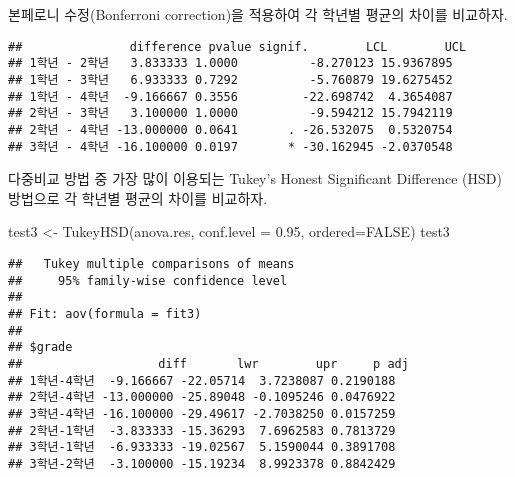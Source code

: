 \documentclass[
]{book}
\newenvironment{Shaded}{\begin{snugshade}}{\end{snugshade}}
\newcommand{\AttributeTok}[1]{\textcolor[rgb]{0.77,0.63,0.00}{#1}}
\newcommand{\ConstantTok}[1]{\textcolor[rgb]{0.00,0.00,0.00}{#1}}
\newcommand{\FloatTok}[1]{\textcolor[rgb]{0.00,0.00,0.81}{#1}}
\newcommand{\FunctionTok}[1]{\textcolor[rgb]{0.00,0.00,0.00}{#1}}
\newcommand{\NormalTok}[1]{#1}
\newcommand{\OtherTok}[1]{\textcolor[rgb]{0.56,0.35,0.01}{#1}}
\newcommand{\SpecialCharTok}[1]{\textcolor[rgb]{0.00,0.00,0.00}{#1}}
\newcommand{\StringTok}[1]{\textcolor[rgb]{0.31,0.60,0.02}{#1}}
\begin{document}
본페로니 수정(Bonferroni correction)을 적용하여 각 학년별 평균의 차이를 비교하자.

\begin{Shaded}
\end{Shaded}

\begin{verbatim}
##               difference pvalue signif.        LCL        UCL
## 1학년 - 2학년   3.833333 1.0000          -8.270123 15.9367895
## 1학년 - 3학년   6.933333 0.7292          -5.760879 19.6275452
## 1학년 - 4학년  -9.166667 0.3556         -22.698742  4.3654087
## 2학년 - 3학년   3.100000 1.0000          -9.594212 15.7942119
## 2학년 - 4학년 -13.000000 0.0641       . -26.532075  0.5320754
## 3학년 - 4학년 -16.100000 0.0197       * -30.162945 -2.0370548
\end{verbatim}

다중비교 방법 중 가장 많이 이용되는 Tukey's Honest Significant Difference (HSD) 방법으로
각 학년별 평균의 차이를 비교하자.

\begin{Shaded}
\begin{Highlighting}[]
\NormalTok{test3 }\OtherTok{\textless{}{-}} \FunctionTok{TukeyHSD}\NormalTok{(anova.res, }\AttributeTok{conf.level =} \FloatTok{0.95}\NormalTok{, }\AttributeTok{ordered=}\ConstantTok{FALSE}\NormalTok{)}
\NormalTok{test3}
\end{Highlighting}
\end{Shaded}

\begin{verbatim}
##   Tukey multiple comparisons of means
##     95% family-wise confidence level
## 
## Fit: aov(formula = fit3)
## 
## $grade
##                   diff       lwr        upr     p adj
## 1학년-4학년  -9.166667 -22.05714  3.7238087 0.2190188
## 2학년-4학년 -13.000000 -25.89048 -0.1095246 0.0476922
## 3학년-4학년 -16.100000 -29.49617 -2.7038250 0.0157259
## 2학년-1학년  -3.833333 -15.36293  7.6962583 0.7813729
## 3학년-1학년  -6.933333 -19.02567  5.1590044 0.3891708
## 3학년-2학년  -3.100000 -15.19234  8.9923378 0.8842429
\end{verbatim}
\end{document}
